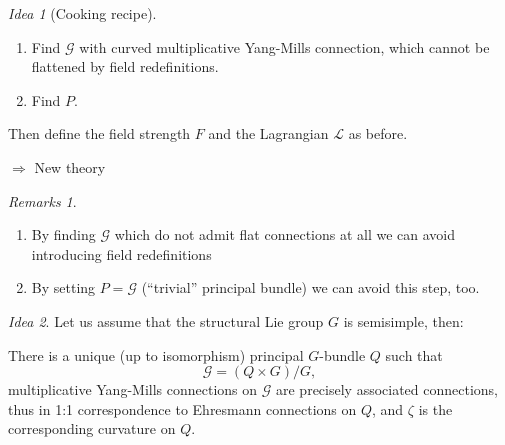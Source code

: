 \documentclass[
aspectratio=3218, 
10pt
]{beamer}
\def\bes{\begin{equation*}}
\def\ees{\end{equation*}}
\theoremstyle{plain}
\theoremstyle{remark}
\newtheorem*{remark}{Remarks}
\newtheorem*{idea}{Idea}
\begin{document}
{\begin{frame}
\begin{idea}[Cooking recipe]
\begin{enumerate}
	\item Find $\mathcal{G}$ with curved multiplicative Yang-Mills connection, which cannot be flattened by field redefinitions.
	\item Find $P$.
\end{enumerate}
Then define the field strength $F$ and the Lagrangian $\mathcal{L}$ as before.

$\Rightarrow$ New theory \smiley
\end{idea}
\pause
\begin{remark}
\begin{enumerate}[leftmargin=10cm]
	\item[@1:] By finding $\mathcal{G}$ which do not admit flat connections at all we can avoid introducing field redefinitions
	\item[@2:] By setting $P = \mathcal{G}$ (``trivial'' principal bundle) we can avoid this step, too.
\end{enumerate}
\end{remark}
\end{frame}


\begin{frame}
\begin{idea}
Let us assume that the structural Lie group $G$ is semisimple, then:
\end{idea}

\begin{theorem}\vspace{.5pt}
There is a unique (up to isomorphism) principal $G$-bundle $Q$ such that 
\bes
\mathcal{G} = (Q\times G) \Big/ G,
\ees
multiplicative Yang-Mills connections on $\mathcal{G}$ are precisely associated connections, thus in 1:1 correspondence to Ehresmann connections on $Q$, and $\zeta$ is the corresponding curvature on $Q$.
\end{theorem}
\end{frame}

}
\end{document}
